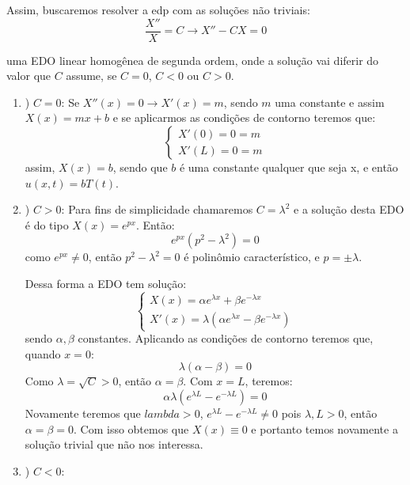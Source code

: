 Assim, buscaremos resolver a edp com as soluções não triviais:
\begin{equation*}
    \frac{X''}{X} = C \longrightarrow X'' - CX = 0
\end{equation*}

uma EDO linear homogênea de segunda ordem, onde a solução vai diferir do valor que $C$ assume, se $C=0$, $C<0$ ou $C>0$. 

\begin{enumerate}[I]
    \item) $C = 0$:
    Se $X''(x) = 0 \rightarrow X'(x) = m$, sendo $m$ uma constante e assim $X(x) = mx+b$ e se aplicarmos as condições de contorno teremos que:
    \begin{equation*}
        \begin{cases}
             X'(0) = 0 = m\\
             X'(L) = 0 = m
        \end{cases}
    \end{equation*}
    assim, $\boxed{X(x) = b}$, sendo que $b$ é uma constante qualquer que seja x, e então $u(x,t) = bT(t)$.
    \item) $C > 0$:
    Para fins de simplicidade chamaremos $C=\lambda^2$ e a solução desta EDO é do tipo $X(x) = e^{px}$. Então:
    \begin{equation*}
        e^{px}(p^2-\lambda^2) = 0
    \end{equation*}
    como $e^{px} \neq 0$, então $p^2 - \lambda^2 = 0$ é polinômio característico, e $p = \pm \lambda$.
    
    Dessa forma a EDO tem solução:
    \begin{equation*}
        \begin{cases}
            X(x) = \alpha e^{\lambda x} + \beta e^{-\lambda x}\\
            X'(x) = \lambda(\alpha e^{\lambda x} - \beta e^{-\lambda x})
        \end{cases}
    \end{equation*}
    sendo $\alpha, \beta$ constantes. Aplicando as condições de contorno teremos que, quando $x=0$:
    \begin{equation*}
        \lambda(\alpha - \beta) = 0
    \end{equation*}
    Como $\lambda = \sqrt{C} > 0$, então $\alpha = \beta$. Com $x = L$, teremos:
    \begin{equation*}
        \alpha \lambda (e^{\lambda L} - e^{-\lambda L}) = 0 
    \end{equation*}
    Novamente teremos que $lambda > 0$, $e^{\lambda L} - e^{-\lambda L} \neq 0$ pois $\lambda, L > 0$, então $\alpha = \beta = 0$. Com isso obtemos que $X(x) \equiv 0$ e portanto temos novamente a solução trivial que não nos interessa.
    \item) $C < 0$:
    

\end{enumerate}
